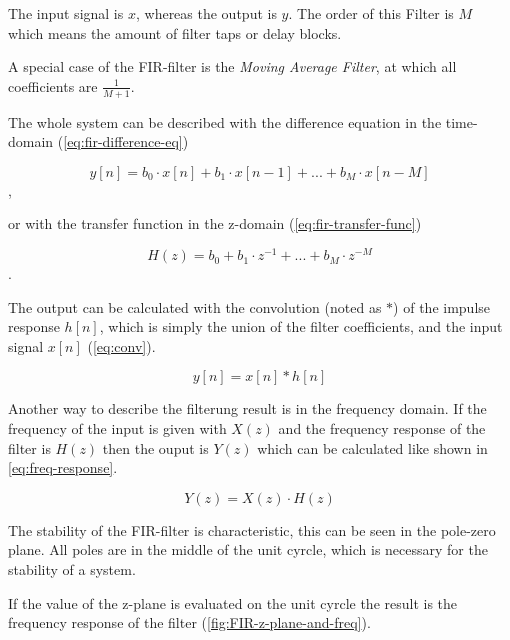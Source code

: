 The input signal is $x$, whereas the output is $y$. The order of this Filter is $M$ which means the amount of
filter taps or delay blocks.

A special case of the \ac{FIR}-filter is the \textit{Moving Average Filter}, at which all coefficients are $\frac{1}{M+1}$.

The whole system can be described with the difference equation in the time-domain (\autoref{eq:fir-difference-eq})

\begin{equation}
    y[n] = b_0 \cdot x[n] + b_1 \cdot x[n-1] + ... + b_M \cdot x[n-M]
    \label{eq:fir-difference-eq}
\end{equation},

or with the transfer function in the z-domain (\autoref{eq:fir-transfer-func})

\begin{equation}
    H(z) = b_0 + b_1 \cdot z^{-1} + ... + b_M \cdot z^{-M}
    \label{eq:fir-transfer-func}
\end{equation}.

The output can be calculated with the convolution (noted as $*$) of the impulse response $h[n]$, which is simply the
union of the filter coefficients, and the input signal $x[n]$ (\autoref{eq:conv}).

\begin{equation}
    y[n] = x[n] * h[n]
    \label{eq:conv}
\end{equation}

Another way to describe the filterung result is in the frequency domain.
If the frequency of the input is given with $X(z)$ and the frequency response of the filter is $H(z)$
then the ouput is $Y(z)$ which can be calculated like shown in \autoref{eq:freq-response}.

\begin{equation}
    Y(z) = X(z) \cdot H(z)
    \label{eq:freq-response}
\end{equation}

The stability of the \ac{FIR}-filter is characteristic, this can be seen in the pole-zero plane. All poles are in
the middle of the unit cyrcle, which is necessary for the stability of a system.

If the value of the z-plane is evaluated on the unit cyrcle the result is the frequency response of the filter
(\autoref{fig:FIR-z-plane-and-freq}).

